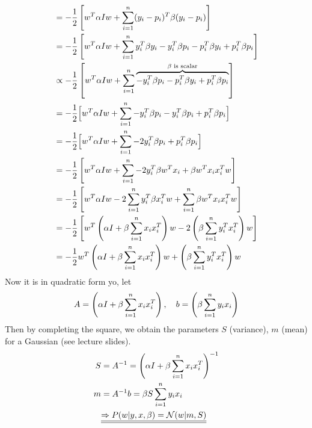 \documentclass[12pt]{article}
\begin{document}
            \begin{align}
                &= -\frac{1}{2} \left[ w^T \alpha I w + \sumlim{1}{n} (y_i - p_i)^T \beta (y_i - p_i) \right] \\
                &= -\frac{1}{2} \left[ w^T \alpha I w + \sumlim{1}{n} y_i^T \beta y_i - y_i^T \beta p_i - p_i^T \beta y_i + p_i^T \beta p_i \right] \\
                &\propto -\frac{1}{2} \left[ w^T \alpha I w + \sumlim{1}{n} \overtext{- y_i^T \beta p_i - p_i^T \beta y_i + p_i^T \beta p_i}{$\beta$ is scalar} \right] \\
                &= -\frac{1}{2} \Big[ w^T \alpha I w + \sumlim{1}{n} - y_i^T \beta p_i - y_i^T \beta p_i + p_i^T \beta p_i \Big] \\
                &= -\frac{1}{2} \Big[ w^T \alpha I w + \sumlim{1}{n} - 2 y_i^T \beta p_i + p_i^T \beta p_i \Big] \\
                &= -\frac{1}{2} \enclb{w^T \alpha I w + \sumlim{1}{n} - 2 y_i^T \beta w^Tx_i + \beta w^T x_i x_i^T w} \\
                &= -\frac{1}{2} \enclb{w^T \alpha I w - 2 \sumlim{1}{n} y_i^T \beta x_i^Tw + \sumlim{1}{n} \beta w^T x_i x_i^T w} \\
                &= -\frac{1}{2} \enclb{w^T \enclp{\alpha I + \beta \sumlim{1}{n} x_ix_i^T} w - 2 \enclp{\beta \sumlim{1}{n} y_i^T x_i^T} w} \\ 
                &= -\frac{1}{2} w^T \enclp{\alpha I + \beta \sumlim{1}{n} x_ix_i^T} w + \enclp{\beta \sumlim{1}{n} y_i^T x_i^T} w
            \end{align}
            Now it is in quadratic form yo, let 
            \begin{align}
                A = \left(\alpha I + \beta \sum\limits_{i=1}^{n} x_i x_i^T\right), \quad b = \left(\beta \sum\limits_{i=1}^{n} y_i x_i\right) 
            \end{align}
            Then by completing the square, we obtain the parameters $S$ (variance), $m$ (mean) for a Gaussian (see lecture slides).
            \begin{align}
            S &= A^{-1} = \left(\alpha I + \beta \sum\limits_{i=1}^{n} x_i x_i^T\right)^{-1} \label{eq:S}\\ 
            m &= A^{-1} b = \beta S \sum\limits_{i=1}^{n} y_i x_i \label{eq:m}\\ 
            &\underline{\underline{\Rightarrow P(w|y,x,\beta) = \mathcal{N}(w|m,S)}}
            \end{align}
\end{document}
